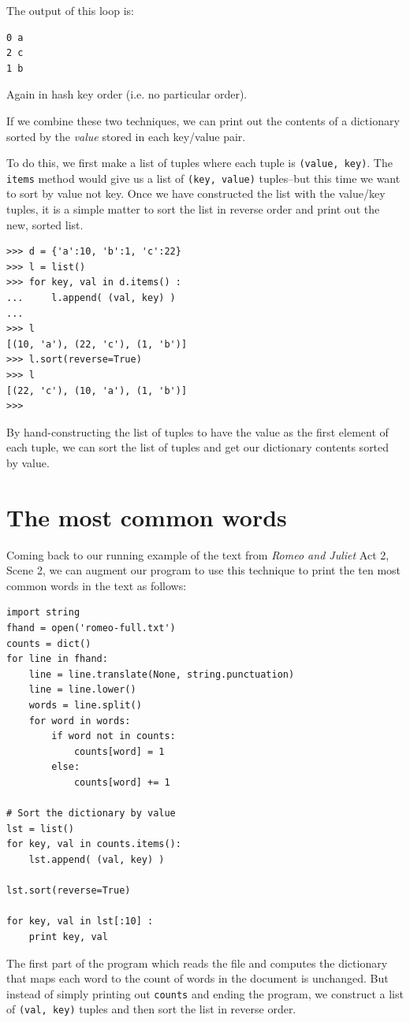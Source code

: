 \documentclass[10pt]{book}
\begin{document}
The output of this loop is:

\beforeverb
\begin{verbatim}
0 a
2 c
1 b
\end{verbatim}
\afterverb
%
Again in hash key order (i.e. no particular order).

If we combine these two techniques, we can print out the contents
of a dictionary sorted by the \emph{value} stored in each key/value
pair.

To do this, we first make a list of tuples where each tuple is 
{\tt (value, key)}.  The {\tt items} method would give us a list of 
{\tt (key, value)} tuples--but this time we want to sort by value not key.
Once we have constructed the list with the value/key tuples, it is a simple
matter to sort the list in reverse order and print out the new, sorted list.

\beforeverb
\begin{verbatim}
>>> d = {'a':10, 'b':1, 'c':22}
>>> l = list()
>>> for key, val in d.items() :
...     l.append( (val, key) )
... 
>>> l
[(10, 'a'), (22, 'c'), (1, 'b')]
>>> l.sort(reverse=True)
>>> l
[(22, 'c'), (10, 'a'), (1, 'b')]
>>> 
\end{verbatim}
\afterverb
%
By hand-constructing the list of tuples to have the value as the first
element of each tuple, we can sort the list of tuples and get our dictionary
contents sorted by value.

\section{The most common words}

Coming back to our running example of the text from \emph{Romeo and Juliet} 
Act 2, Scene 2, we can augment our program to use this technique to 
print the ten most common words in the text as follows:

\beforeverb
\begin{verbatim}
import string
fhand = open('romeo-full.txt')
counts = dict()
for line in fhand:
    line = line.translate(None, string.punctuation)
    line = line.lower()
    words = line.split()
    for word in words:
        if word not in counts:
            counts[word] = 1
        else:
            counts[word] += 1

# Sort the dictionary by value
lst = list()
for key, val in counts.items():
    lst.append( (val, key) )

lst.sort(reverse=True)

for key, val in lst[:10] :
    print key, val
\end{verbatim}
\afterverb
%
The first part of the program which reads the file and computes 
the dictionary that maps each word to the count of words in the 
document is unchanged.  But instead of simply printing out 
{\tt counts} and ending the program, we construct a list 
of {\tt (val, key)} tuples and then sort the list in reverse order.
\end{document}
